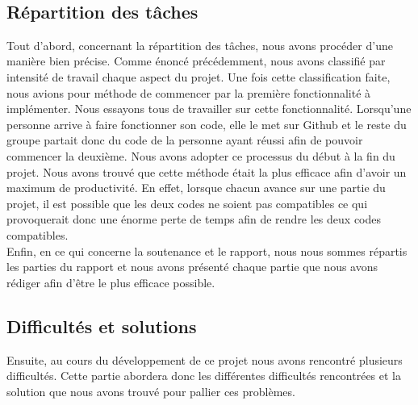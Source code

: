 \documentclass[12pt]{article}
\begin{document}
\
\subsection{Répartition des tâches}

Tout d'abord, concernant la répartition des tâches, nous avons procéder d'une manière bien précise. Comme énoncé précédemment, nous avons classifié par intensité de travail chaque aspect du projet. Une fois cette classification faite, nous avions pour méthode de commencer par la première fonctionnalité à implémenter. Nous essayons tous de travailler sur cette fonctionnalité. Lorsqu'une personne arrive à faire fonctionner son code, elle le met sur Github et le reste du groupe partait donc du code de la personne ayant réussi afin de pouvoir commencer la deuxième. Nous avons adopter ce processus du début à la fin du projet. Nous avons trouvé que cette méthode était la plus efficace afin d'avoir un maximum de productivité. En effet, lorsque chacun avance sur une partie du projet, il est possible que les deux codes ne soient pas compatibles ce qui provoquerait donc une énorme perte de temps afin de rendre les deux codes compatibles. \\

Enfin, en ce qui concerne la soutenance et le rapport, nous nous sommes répartis les parties du rapport et nous avons présenté chaque partie que nous avons rédiger afin d'être le plus efficace possible. 



\subsection{Difficultés et solutions}

Ensuite, au cours du développement de ce projet nous avons rencontré plusieurs difficultés. Cette partie abordera donc les différentes difficultés rencontrées et la solution que nous avons trouvé pour pallier ces problèmes. \\
\end{document}
